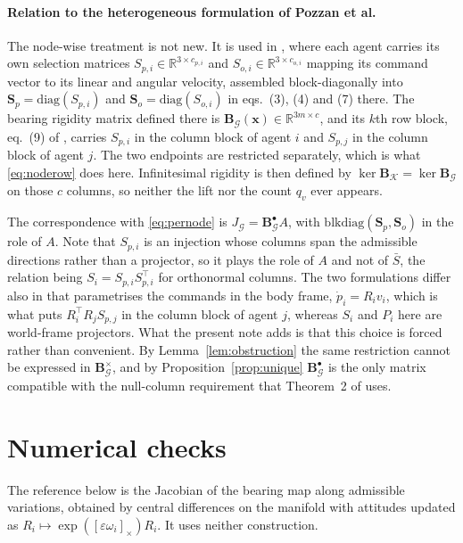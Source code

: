 \documentclass[11pt,a4paper]{article}
\theoremstyle{plain}
\theoremstyle{definition}
\newcommand{\R}{\mathbb{R}}
\newcommand{\Bper}{\mathbf{B}^{\times}}
\newcommand{\Bnode}{\mathbf{B}^{\bullet}}
\begin{document}
\paragraph{Relation to the heterogeneous formulation of Pozzan et al.}
The node-wise treatment is not new. It is used in \cite{Pozzan2021}, where each
agent carries its own selection matrices $S_{p,i}\in\R^{3\times c_{p,i}}$ and
$S_{o,i}\in\R^{3\times c_{o,i}}$ mapping its command vector to its linear and
angular velocity, assembled block-diagonally into
$\mathbf S_p=\mathrm{diag}(S_{p,i})$ and $\mathbf S_o=\mathrm{diag}(S_{o,i})$
in eqs.~(3), (4) and (7) there. The bearing rigidity matrix defined there is
$\mathbf B_{\mathcal G}(\mathbf x)\in\R^{3m\times c}$, and its $k$th row block,
eq.~(9) of \cite{Pozzan2021}, carries $S_{p,i}$ in the column block of agent
$i$ and $S_{p,j}$ in the column block of agent $j$. The two endpoints are
restricted separately, which is what \eqref{eq:noderow} does here.
Infinitesimal rigidity is then defined by
$\ker\mathbf B_{\mathcal K}=\ker\mathbf B_{\mathcal G}$ on those $c$ columns,
so neither the lift nor the count $q_v$ ever appears.

The correspondence with \eqref{eq:pernode} is
$J_{\mathcal G}=\Bnode_{\mathcal G}A$, with
$\mathrm{blkdiag}(\mathbf S_p,\mathbf S_o)$ in the role of $A$. Note that
$S_{p,i}$ is an injection whose columns span the admissible directions rather
than a projector, so it plays the role of $A$ and not of $\bar S$, the relation
being $S_i=S_{p,i}S_{p,i}^\top$ for orthonormal columns. The two formulations
differ also in that \cite{Pozzan2021} parametrises the commands in the body
frame, $\dot p_i=R_iv_i$, which is what puts $R_i^\top R_jS_{p,j}$ in the
column block of agent $j$, whereas $S_i$ and $P_i$ here are world-frame
projectors. What the present note adds is that this choice is forced rather
than convenient. By Lemma~\ref{lem:obstruction} the same restriction cannot be
expressed in $\Bper_{\mathcal G}$, and by Proposition~\ref{prop:unique}
$\Bnode_{\mathcal G}$ is the only matrix compatible with the null-column
requirement that Theorem~2 of \cite{michieletto2021} uses.

\section{Numerical checks}

The reference below is the Jacobian of the bearing map along admissible
variations, obtained by central differences on the manifold with attitudes
updated as $R_i\mapsto\exp([\varepsilon\omega_i]_\times)R_i$. It uses neither
construction.
\end{document}
